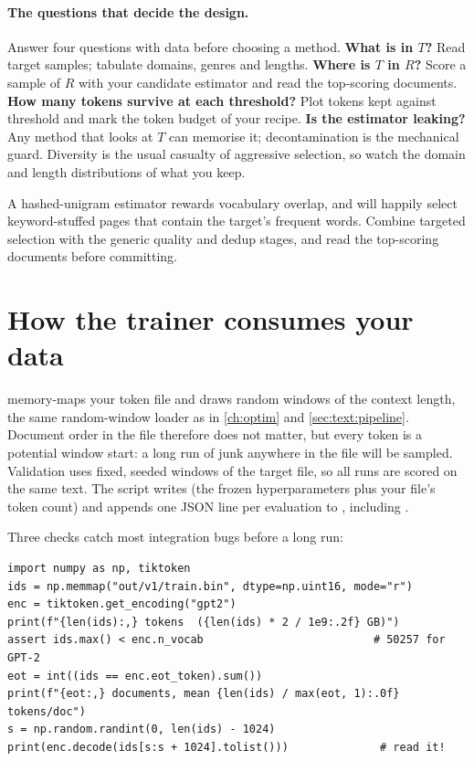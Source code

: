 \paragraph{The questions that decide the design.} Answer four questions with data before choosing a
method. \textbf{What is in $T$?} Read target samples; tabulate domains, genres and lengths.
\textbf{Where is $T$ in $R$?} Score a sample of $R$ with your candidate estimator and read the
top-scoring documents. \textbf{How many tokens survive at each threshold?} Plot tokens kept against
threshold and mark the token budget of your recipe. \textbf{Is the estimator leaking?} Any method
that looks at $T$ can memorise it; decontamination is the mechanical guard. Diversity is the usual
casualty of aggressive selection, so watch the domain and length distributions of what you keep.

\begin{pitfall}
A hashed-unigram estimator rewards vocabulary overlap, and will happily select keyword-stuffed pages
that contain the target's frequent words. Combine targeted selection with the generic quality and
dedup stages, and read the top-scoring documents before committing.
\end{pitfall}

\section{How the trainer consumes your data}\label{sec:proj4:training}

 memory-maps your token file and draws random windows of the context length,
the same random-window loader as in \cref{ch:optim} and \cref{sec:text:pipeline}. Document order in
the file therefore does not matter, but every token is a potential window start: a long run of junk
anywhere in the file will be sampled. Validation uses fixed, seeded windows of the target file, so all
runs are scored on the same text. The script writes  (the frozen
hyperparameters plus your file's token count) and appends one JSON line per evaluation to
, including .

Three checks catch most integration bugs before a long run:

\begin{lstlisting}
import numpy as np, tiktoken
ids = np.memmap("out/v1/train.bin", dtype=np.uint16, mode="r")
enc = tiktoken.get_encoding("gpt2")
print(f"{len(ids):,} tokens  ({len(ids) * 2 / 1e9:.2f} GB)")
assert ids.max() < enc.n_vocab                          # 50257 for GPT-2
eot = int((ids == enc.eot_token).sum())
print(f"{eot:,} documents, mean {len(ids) / max(eot, 1):.0f} tokens/doc")
s = np.random.randint(0, len(ids) - 1024)
print(enc.decode(ids[s:s + 1024].tolist()))              # read it!
\end{lstlisting}

